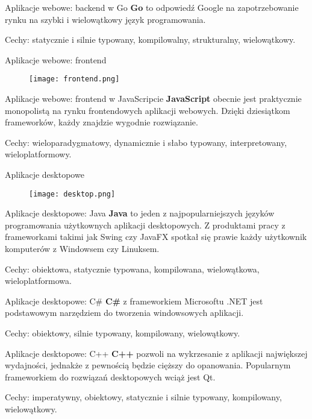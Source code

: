 \begin{frame}{Aplikacje webowe: backend w Go}		
	\textbf{Go} to odpowiedź Google na zapotrzebowanie rynku na szybki i wielowątkowy język programowania. 
	
	Cechy: statycznie i silnie typowany, kompilowalny, strukturalny, wielowątkowy.
\end{frame}

\begin{frame}{Aplikacje webowe: frontend}		
	\begin{figure}
		\centering
		\texttt{[image: frontend.png]}
	\end{figure}
\end{frame}

\begin{frame}{Aplikacje webowe: frontend w JavaScripcie}		
	\textbf{JavaScript} obecnie jest praktycznie monopolistą na rynku frontendowych aplikacji webowych. Dzięki dziesiątkom frameworków, każdy znajdzie wygodnie rozwiązanie.
	
	Cechy: wieloparadygmatowy, dynamicznie i słabo typowany, interpretowany, wieloplatformowy.
\end{frame}

\begin{frame}{Aplikacje desktopowe}		
	\begin{figure}
		\centering
		\texttt{[image: desktop.png]}
	\end{figure}
\end{frame}

\begin{frame}{Aplikacje desktopowe: Java}		
	\textbf{Java} to jeden z najpopularniejszych języków programowania użytkownych aplikacji desktopowych. Z produktami pracy z frameworkami takimi jak Swing czy JavaFX spotkał się prawie każdy użytkownik komputerów z Windowsem czy Linuksem.
	
	Cechy: obiektowa, statycznie typowana, kompilowana, wielowątkowa, wieloplatformowa.
\end{frame}

\begin{frame}{Aplikacje desktopowe: C\#}		
	\textbf{C\#} z frameworkiem Microsoftu .NET jest podstawowym narzędziem do tworzenia windowsowych aplikacji.
	
	Cechy: obiektowy, silnie typowany, kompilowany, wielowątkowy.
\end{frame}

\begin{frame}{Aplikacje desktopowe: C++}		
	\textbf{C++} pozwoli na wykrzesanie z aplikacji największej wydajności, jednakże z pewnością będzie cięższy do opanowania. Popularnym frameworkiem do rozwiązań desktopowych wciąż jest Qt.
	
	Cechy: imperatywny, obiektowy, statycznie i silnie typowany, kompilowany, wielowątkowy.
\end{frame}

